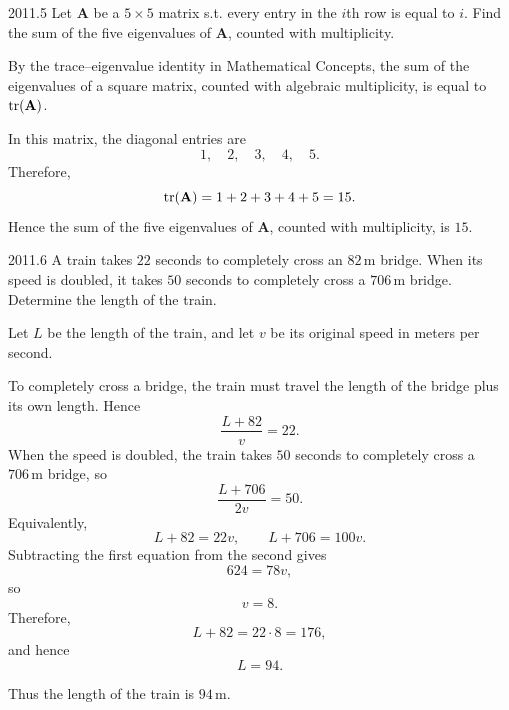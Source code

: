     \begin{pastproblem}{2011.5}
        Let $\mathbf{A}$ be a $5\times 5$ matrix s.t. every entry in the $i$th row is equal to
        $i$. Find the sum of the five eigenvalues of $\mathbf{A}$, counted with multiplicity.
    \end{pastproblem}

    \begin{solution}
        By the trace--eigenvalue identity in Mathematical Concepts, the sum of the eigenvalues of a square matrix, counted with algebraic multiplicity, is equal
        to $\operatorname{tr}(\mathbf{A})$.

        In this matrix, the diagonal entries are
        \[
            1,\quad 2,\quad 3,\quad 4,\quad 5.
        \]
        Therefore,
        \[
            \operatorname{tr}(\mathbf{A})
            =
            1+2+3+4+5
            =
            15.
        \]
        Hence the sum of the five eigenvalues of $\mathbf{A}$, counted with multiplicity, is
        $\boxed{15}$.
    \end{solution}

    \begin{pastproblem}{2011.6}
        A train takes $22$ seconds to completely cross an $82\,\mathrm{m}$ bridge. When its speed is
        doubled, it takes $50$ seconds to completely cross a $706\,\mathrm{m}$ bridge. Determine the
        length of the train.
    \end{pastproblem}

    \begin{solution}
        Let $L$ be the length of the train, and let $v$ be its original speed in meters per second.

        To completely cross a bridge, the train must travel the length of the bridge plus its own
        length. Hence
        \[
            \frac{L+82}{v}=22.
        \]
        When the speed is doubled, the train takes $50$ seconds to completely cross a
        $706\,\mathrm{m}$ bridge, so
        \[
            \frac{L+706}{2v}=50.
        \]
        Equivalently,
        \[
            L+82=22v,
            \qquad
            L+706=100v.
        \]
        Subtracting the first equation from the second gives
        \[
            624=78v,
        \]
        so
        \[
            v=8.
        \]
        Therefore,
        \[
            L+82=22\cdot 8=176,
        \]
        and hence
        \[
            L=94.
        \]

        Thus the length of the train is $\boxed{94\,\mathrm{m}}$.
    \end{solution}


